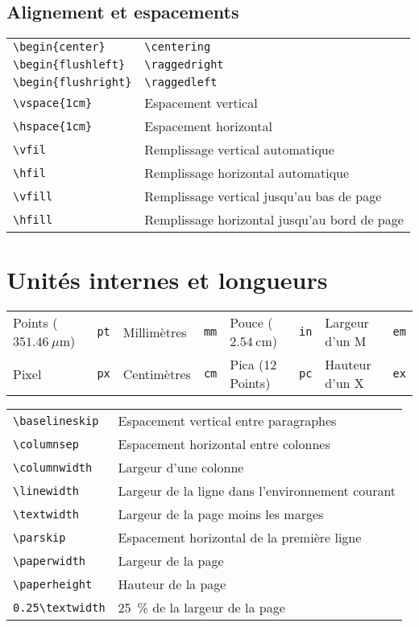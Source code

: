 \documentclass{article}
\let\code\lstinline
\begin{document}
\begin{multicols*}{3}
\subsection*{Alignement et espacements}
\begin{tabular}{*2{>{}l}}
\code!\begin{center}! & \code!\centering! \\
\code!\begin{flushleft}! & \code!\raggedright! \\
\code!\begin{flushright}! & \code!\raggedleft! \\
\code!\vspace{1cm}! & Espacement vertical \\
\code!\hspace{1cm}! & Espacement horizontal \\
\code!\vfil! & Remplissage vertical automatique \\
\code!\hfil! & Remplissage horizontal automatique \\
\code!\vfill! & Remplissage vertical jusqu'au bas de page \\
\code!\hfill! & Remplissage horizontal jusqu'au bord de page \\
\end{tabular}

\section*{Unités internes et longueurs}
\begin{tabular}{ll|ll|ll|ll}
Points ($\SI{351.46}{\mu\meter}$) & \code+pt+ & Millimètres & \code+mm+ & Pouce ($\SI{2.54}{\centi\metre}$)& \code+in+ & Largeur d'un M & \code+em+ \\
Pixel & \code+px+ & Centimètres & \code+cm+ & Pica (12 Points) & \code+pc+ & Hauteur d'un X & \code+ex+ \\
\end{tabular}

\begin{tabular}{*2{>{}l}}
\code!\baselineskip! & Espacement vertical entre paragraphes \\
\code!\columnsep! & Espacement horizontal entre colonnes \\
\code!\columnwidth! & Largeur d'une colonne \\
\code!\linewidth! & Largeur de la ligne dans l'environnement courant \\
\code!\textwidth! & Largeur de la page moins les marges \\
\code!\parskip! & Espacement horizontal de la première ligne \\
\code!\paperwidth! & Largeur de la page \\
\code!\paperheight! & Hauteur de la page \\
\code!0.25\textwidth! & \SI{25}{\percent} de la largeur de la page \\
\end{tabular}


\end{multicols*}
\end{document}
